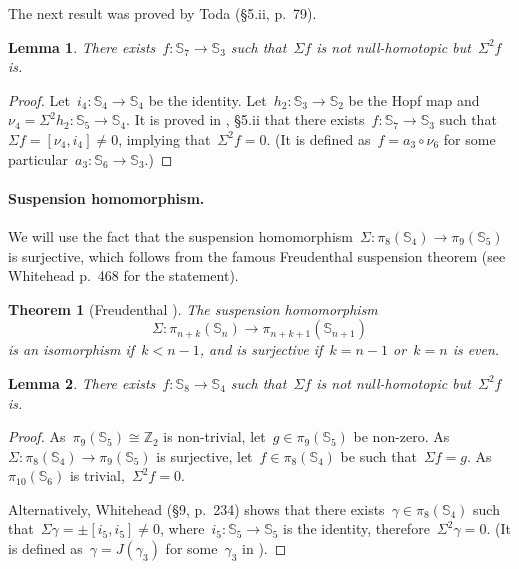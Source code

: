 \documentclass[english,11pt]{article}
\theoremstyle{plain}
\newtheorem{theorem}{Theorem}[section]
\newtheorem{lemma}{Lemma}[section]
\theoremstyle{remark}
\theoremstyle{definition}
\newcommand{\Sp}{\mathbb{S}}
\newcommand{\Z}{\mathbb{Z}}
\begin{document}
The next result was proved by Toda \cite{Toda52} (\S5.ii, p.~79).
\begin{lemma}
There exists~$f:\Sp_7\to\Sp_3$ such that~$\Sigma f$ is not null-homotopic but~$\Sigma^2 f$ is.
\end{lemma}
\begin{proof}
Let~$i_4:\Sp_4\to\Sp_4$ be the identity. Let~$h_2:\Sp_3\to\Sp_2$ be the Hopf map and~$\nu_{4}=\Sigma^2h_2:\Sp_{5}\to\Sp_{4}$. It is proved in \cite{Toda52}, \S 5.ii that there exists~$f:\Sp_7\to\Sp_3$ such that~$\Sigma f=[\nu_4,i_4]\neq 0$, implying that~$\Sigma^2 f=0$. (It is defined as~$f=a_3\circ \nu_6$ for some particular~$a_3:\Sp_6\to\Sp_3$.)
\end{proof}


\paragraph{Suspension homomorphism.}
We will use the fact that the suspension homomorphism~$\Sigma:\pi_8(\Sp_4)\to \pi_9(\Sp_5)$ is surjective, which follows from the famous Freudenthal suspension theorem (see Whitehead \cite{Whitehead46} p.~468 for the statement).
\begin{theorem}[Freudenthal \cite{Freudenthal37}]
The suspension homomorphism
\begin{equation*}
\Sigma:\pi_{n+k}(\Sp_n)\to\pi_{n+k+1}(\Sp_{n+1})
\end{equation*}
is an isomorphism if~$k<n-1$, and is surjective if~$k=n-1$ or~$k=n$ is even.
\end{theorem}

\begin{lemma}
There exists~$f:\Sp_8\to\Sp_4$ such that~$\Sigma f$ is not null-homotopic but~$\Sigma^2 f$ is.
\end{lemma}
\begin{proof}

As~$\pi_9(\Sp_5)\cong \Z_2$ is non-trivial, let~$g\in\pi_9(\Sp_5)$ be non-zero. As~$\Sigma:\pi_8(\Sp_4)\to \pi_9(\Sp_5)$ is surjective, let~$f\in\pi_8(\Sp_4)$ be such that~$\Sigma f=g$. As~$\pi_{10}(\Sp_6)$ is trivial,~$\Sigma^2 f=0$.

Alternatively, Whitehead \cite{Whitehead50} (\S 9, p.~234) shows that there exists~$\gamma\in\pi_8(\Sp_4)$ such that~$\Sigma\gamma=\pm[i_5,i_5]\neq 0$, where~$i_5:\Sp_5\to\Sp_5$ is the identity, therefore~$\Sigma^2\gamma=0$. (It is defined as~$\gamma=J(\gamma_3)$ for some~$\gamma_3$ in \cite{Whitehead50}).
\end{proof}
\end{document}
